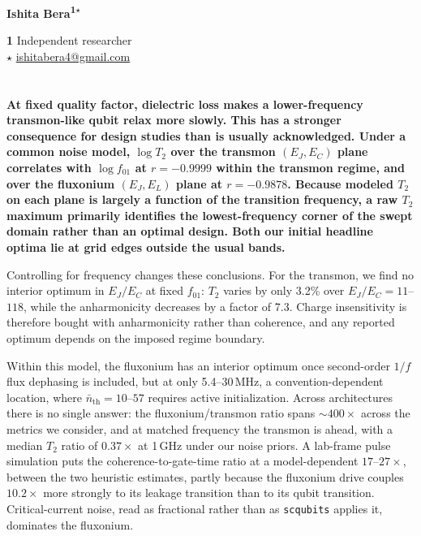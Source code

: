 \documentclass{SciPost}
\begin{document}
\begin{center}{\Large \textbf{\color{scipostdeepblue}{
Coherence sweet spots are frequency minima in disguise:\\
Metric sensitivity in transmon and fluxonium design spaces
}}}\end{center}

\begin{center}\textbf{
Ishita Bera\textsuperscript{1$\star$}
}\end{center}

\begin{center}
{\bf 1} Independent researcher
\\[\baselineskip]
$\star$ \href{mailto:ishitabera4@gmail.com}{\small ishitabera4@gmail.com}
\end{center}

\section*{\color{scipostdeepblue}{Abstract}}
{\bfseries\boldmath
At fixed quality factor, dielectric loss makes a lower-frequency transmon-like qubit relax more
slowly. This has a stronger consequence for design studies than is usually
acknowledged. Under a common noise model, $\log T_2$ over the transmon $(E_J,E_C)$ plane correlates
with $\log f_{01}$ at $r=-0.9999$ within the transmon regime, and over the fluxonium $(E_J,E_L)$
plane at $r=-0.9878$. Because modeled $T_2$ on each plane is largely a function of the transition
frequency, a raw $T_2$ maximum primarily identifies the lowest-frequency corner of the swept domain
rather than an optimal design. Both our initial headline optima lie at grid edges outside the usual bands.

Controlling for frequency changes these conclusions. For the transmon, we find no interior optimum
in $E_J/E_C$ at fixed $f_{01}$: $T_2$ varies by only 3.2\% over $E_J/E_C=11$--$118$, while
the anharmonicity decreases by a factor of 7.3. Charge insensitivity is therefore bought with
anharmonicity rather than coherence, and any reported optimum depends on the imposed regime boundary.

Within this model, the fluxonium has an interior optimum once second-order $1/f$ flux dephasing is
included, but at only 5.4--30\,MHz, a convention-dependent location, where $\bar n_{\mathrm{th}}=10$--$57$ requires active initialization.
Across architectures there is no single answer: the fluxonium/transmon ratio spans ${\sim}400\times$
across the metrics we consider, and at matched frequency the transmon is ahead, with a median $T_2$
ratio of $0.37\times$ at 1\,GHz under our noise priors. A lab-frame pulse simulation puts the
coherence-to-gate-time ratio at a model-dependent $17$--$27\times$, between the two heuristic estimates, partly because the fluxonium drive couples $10.2\times$ more strongly to its leakage transition than to its
qubit transition. Critical-current noise, read as fractional rather than as \texttt{scqubits}
applies it, dominates the fluxonium.\par}
\end{document}
